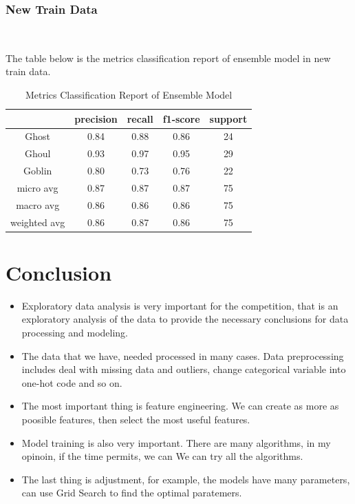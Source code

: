 \subsubsection{New Train Data}
\

The table below is the metrics classification report 
of ensemble model in new train data.
\begin{table}[h]  \centering
	\caption{Metrics Classification Report of Ensemble Model}
	\label{tbl:metrics_classification_ensemble_new}
	\begin{tabular}{ccccc}
		\hline
		&precision & recall & f1-score & support\\
		\hline
		Ghost  &  0.84  &  0.88  & 0.86 &  24\\
		Ghoul  &  0.93  & 0.97 &  0.95 &   29\\
		Goblin  &  0.80 &  0.73  & 0.76  &  22\\
		\hline
		micro avg & 0.87  & 0.87  & 0.87  & 75\\
		macro avg &  0.86  &  0.86 & 0.86 &   75\\
		weighted avg  &  0.86 & 0.87  &  0.86  &  75\\
		\hline 
	\end{tabular}
\end{table}	


\section{Conclusion}

\begin{itemize}
	\item Exploratory data analysis is 
	very important for the competition,
	that is an exploratory analysis 
	of the data to 
	provide the necessary conclusions 
	for data processing and modeling. 
	\item The data that we have,
	needed processed in many cases.
	Data preprocessing includes 
	deal with missing data and outliers,
	change categorical variable 
	into one-hot code and so on.
	\item The most important thing is
	feature engineering.
	We can create as more as poosible features,
	then select the most useful features.
	\item Model training is also very important.
	There are many algorithms, 
	in my opinoin, 
	if the time permits,
	we can We can try all the algorithms. 
	\item The last thing is adjustment,
	for example,
	the models have many parameters,
	can use Grid Search to find 
	the optimal paratemers.	
\end{itemize}











